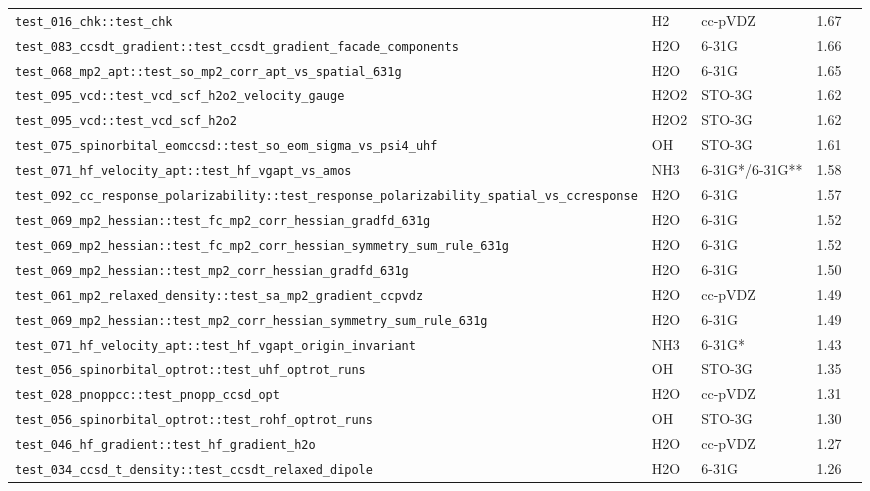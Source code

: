\documentclass[10pt]{article}
\begin{document}
\begin{longtable}{l l l r c}
\texttt{test\_016\_chk::test\_chk} & H2 & cc-pVDZ & 1.67 &  \\
\texttt{test\_083\_ccsdt\_gradient::test\_ccsdt\_gradient\_facade\_components} & H2O & 6-31G & 1.66 &  \\
\texttt{test\_068\_mp2\_apt::test\_so\_mp2\_corr\_apt\_vs\_spatial\_631g} & H2O & 6-31G & 1.65 &  \\
\texttt{test\_095\_vcd::test\_vcd\_scf\_h2o2\_velocity\_gauge} & H2O2 & STO-3G & 1.62 &  \\
\texttt{test\_095\_vcd::test\_vcd\_scf\_h2o2} & H2O2 & STO-3G & 1.62 &  \\
\texttt{test\_075\_spinorbital\_eomccsd::test\_so\_eom\_sigma\_vs\_psi4\_uhf} & OH & STO-3G & 1.61 &  \\
\texttt{test\_071\_hf\_velocity\_apt::test\_hf\_vgapt\_vs\_amos} & NH3 & 6-31G{*}/6-31G{*}{*} & 1.58 &  \\
\texttt{test\_092\_cc\_response\_polarizability::test\_response\_polarizability\_spatial\_vs\_ccresponse} & H2O & 6-31G & 1.57 &  \\
\texttt{test\_069\_mp2\_hessian::test\_fc\_mp2\_corr\_hessian\_gradfd\_631g} & H2O & 6-31G & 1.52 &  \\
\texttt{test\_069\_mp2\_hessian::test\_fc\_mp2\_corr\_hessian\_symmetry\_sum\_rule\_631g} & H2O & 6-31G & 1.52 &  \\
\texttt{test\_069\_mp2\_hessian::test\_mp2\_corr\_hessian\_gradfd\_631g} & H2O & 6-31G & 1.50 &  \\
\texttt{test\_061\_mp2\_relaxed\_density::test\_sa\_mp2\_gradient\_ccpvdz} & H2O & cc-pVDZ & 1.49 &  \\
\texttt{test\_069\_mp2\_hessian::test\_mp2\_corr\_hessian\_symmetry\_sum\_rule\_631g} & H2O & 6-31G & 1.49 &  \\
\texttt{test\_071\_hf\_velocity\_apt::test\_hf\_vgapt\_origin\_invariant} & NH3 & 6-31G{*} & 1.43 &  \\
\texttt{test\_056\_spinorbital\_optrot::test\_uhf\_optrot\_runs} & OH & STO-3G & 1.35 &  \\
\texttt{test\_028\_pnoppcc::test\_pnopp\_ccsd\_opt} & H2O & cc-pVDZ & 1.31 &  \\
\texttt{test\_056\_spinorbital\_optrot::test\_rohf\_optrot\_runs} & OH & STO-3G & 1.30 &  \\
\texttt{test\_046\_hf\_gradient::test\_hf\_gradient\_h2o} & H2O & cc-pVDZ & 1.27 &  \\
\texttt{test\_034\_ccsd\_t\_density::test\_ccsdt\_relaxed\_dipole} & H2O & 6-31G & 1.26 &  \\

\end{longtable}
\end{document}
